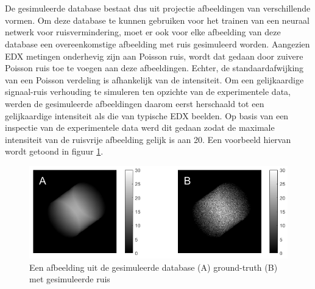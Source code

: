 \documentclass{report}
\begin{document}
\\ \\
De gesimuleerde database bestaat dus uit projectie afbeeldingen van verschillende vormen. Om deze database te kunnen gebruiken voor het trainen van een neuraal netwerk voor ruisvermindering, moet er ook voor elke afbeelding van deze database een overeenkomstige afbeelding met ruis gesimuleerd worden. Aangezien EDX metingen onderhevig zijn aan Poisson ruis, wordt dat gedaan door zuivere Poisson ruis toe te voegen aan deze afbeeldingen. Echter, de standaardafwijking van een Poisson verdeling is afhankelijk van de intensiteit. Om een gelijkaardige signaal-ruis verhouding te simuleren ten opzichte van de experimentele data, werden de gesimuleerde afbeeldingen daarom eerst herschaald tot een gelijkaardige intensiteit als die van typische EDX beelden. Op basis van een inspectie van de experimentele data werd dit gedaan zodat de maximale intensiteit van de ruisvrije afbeelding gelijk is aan 20. Een voorbeeld hiervan wordt getoond in figuur \ref{fig:data_synthdbnoise}.
\begin{figure}[h!]
	\centering
	\includegraphics[width=15cm]{images/data/synthdbnoise.png}
	\caption{Een afbeelding uit de gesimuleerde database (A) ground-truth (B) met gesimuleerde ruis}
	\label{fig:data_synthdbnoise}
\end{figure}
\end{document}

